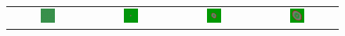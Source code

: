\begin{figure}[h]
\centering
\mySfFamily
\begin{tabular}{c c c c}
\includegraphics[width = 0.2\textwidth]{../images/predator_prey_11_by_11_f_1.4_k_2.png} & \includegraphics[width = 0.2\textwidth]{../images/../images/predator_prey_11_by_11_f_1.4_k_2_i1.png} & \includegraphics[width = 0.2\textwidth]{../images/../images/predator_prey_11_by_11_f_1.4_k_2_i2.png} & \includegraphics[width = 0.2\textwidth]{../images/../images/predator_prey_11_by_11_f_1.4_k_2_i3.png}\\[2ex]

\end{tabular}
\end{figure}

